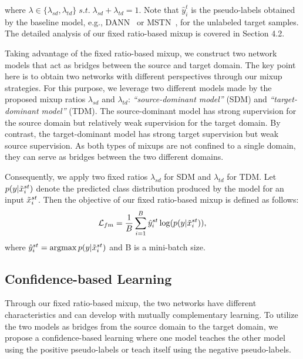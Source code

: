 \documentclass[final]{cvpr}
\begin{document}
where $\lambda \in \{\lambda_{sd}, \lambda_{td}\}\; s.t. \; \lambda_{sd} + \lambda_{td} = 1$. Note that $\hat{y}^{t}_i$ is the pseudo-labels obtained by the baseline model, e.g., DANN~\cite{Ganin2015} or MSTN~\cite{MSTN}, for the unlabeled target samples. The detailed analysis of our fixed ratio-based mixup is covered in Section 4.2.

Taking advantage of the fixed ratio-based mixup, we construct two network models that act as bridges between the source and target domain. The key point here is to obtain two networks with different perspectives through our mixup strategies. For this purpose, we leverage two different models made by the proposed mixup ratios $\lambda_{sd}$ and $\lambda_{td}$: \emph{“source-dominant model”} (SDM) and \emph{“target-dominant model”} (TDM). The source-dominant model has strong supervision for the source domain but relatively weak supervision for the target domain. By contrast, the target-dominant model has strong target supervision but weak source supervision. As both types of mixups are not confined to a single domain, they can serve as bridges between the two different domains.

Consequently, we apply two fixed ratios $\lambda_{sd}$ for SDM and $\lambda_{td}$ for TDM. Let $p(y|\Tilde{x}_i^{st})$ denote the predicted class distribution produced by the model for an input $\Tilde{x}_i^{st}$. Then the objective of our fixed ratio-based mixup is defined as follows:
\begin{equation}
    \mathcal{L}_{fm}= \frac{1}{B}\sum_{i=1}^{B}{\hat{y}_i^{st} \log(p(y|\Tilde{x}_i^{st}))},
\end{equation}
where $\hat{y}^{st}_i=\operatorname*{argmax}p(y|\Tilde{x}^{st}_i)$ and B is a mini-batch size.

\subsection{Confidence-based Learning}
Through our fixed ratio-based mixup, the two networks have different characteristics and can develop with mutually complementary learning. To utilize the two models as bridges from the source domain to the target domain, we propose a confidence-based learning where one model teaches the other model using the positive pseudo-labels or teach itself using the negative pseudo-labels.
\end{document}
